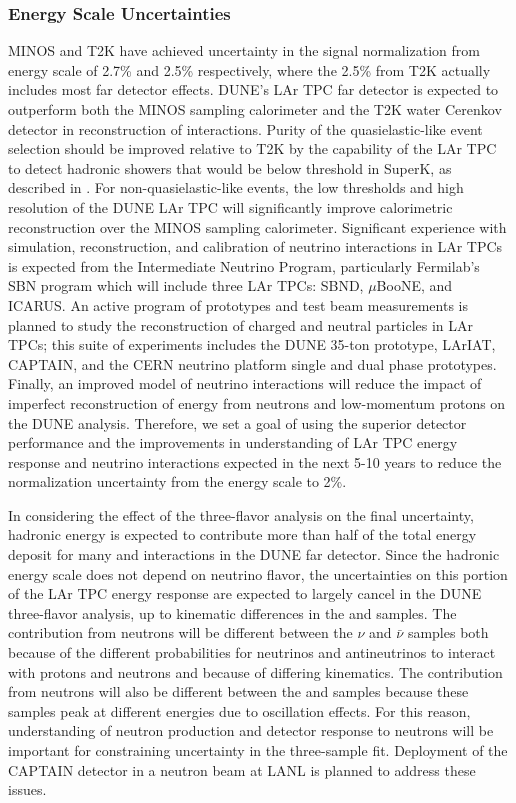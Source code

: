 \subsubsection{\nue Energy Scale Uncertainties}
\label{sec:syst_just_fd}
MINOS and T2K have achieved uncertainty in the \nue signal normalization from \nue energy scale
of 2.7\% and 2.5\% respectively,
where the 2.5\% from T2K actually includes most far detector effects. DUNE's LAr TPC far detector
is expected to outperform both the MINOS sampling calorimeter and the T2K water Cerenkov detector
in reconstruction of \nue interactions. Purity of the quasielastic-like event selection
should be improved relative to T2K by the capability of the LAr TPC to detect hadronic showers
that would be below threshold in SuperK, as described in \cite{Mosel-Lalakulich-Gallmeister:2014}. For non-quasielastic-like
events, the low thresholds and high resolution of the DUNE LAr TPC will significantly improve
calorimetric reconstruction over the MINOS sampling calorimeter.
Significant experience with simulation, reconstruction, and calibration
of neutrino interactions in LAr TPCs is expected from the Intermediate Neutrino Program, particularly
Fermilab's SBN program which will include three LAr TPCs: SBND, $\mu$BooNE, and ICARUS. An active program of
prototypes and test beam measurements is planned to study the reconstruction of charged and neutral particles
in LAr TPCs; this suite of experiments includes the DUNE 35-ton prototype, LArIAT, CAPTAIN, and
the CERN neutrino platform single and dual phase prototypes.
Finally, an improved model of neutrino interactions will reduce the impact of imperfect reconstruction
of energy from neutrons and low-momentum protons on the DUNE analysis.
Therefore, we set a goal of using the superior detector performance and the improvements
in understanding of LAr TPC energy response and neutrino interactions
expected in the next 5-10 years to reduce the normalization uncertainty
from the \nue energy scale to 2\%.

In considering the effect of the three-flavor analysis on the final uncertainty, hadronic energy is expected
to contribute more than half of the total energy deposit for many \nue and \numu interactions in the DUNE
far detector. Since the hadronic energy scale does not depend on neutrino flavor, the uncertainties on this
portion of the LAr TPC energy response are expected to largely cancel in the DUNE three-flavor analysis, up
to kinematic differences in the \nue and \numu samples.
The contribution from neutrons will be different between the $\nu$ and $\bar{\nu}$
samples both because of the different
probabilities for neutrinos and antineutrinos to interact with protons and neutrons and because of differing
kinematics. The contribution from neutrons will also be different between the \nue and \numu samples because
these samples peak at different energies due to oscillation effects. For this reason, understanding
of neutron production and detector response to neutrons will be important for constraining uncertainty in
the three-sample fit. Deployment of the CAPTAIN detector in a neutron beam at LANL is planned to address
these issues.


